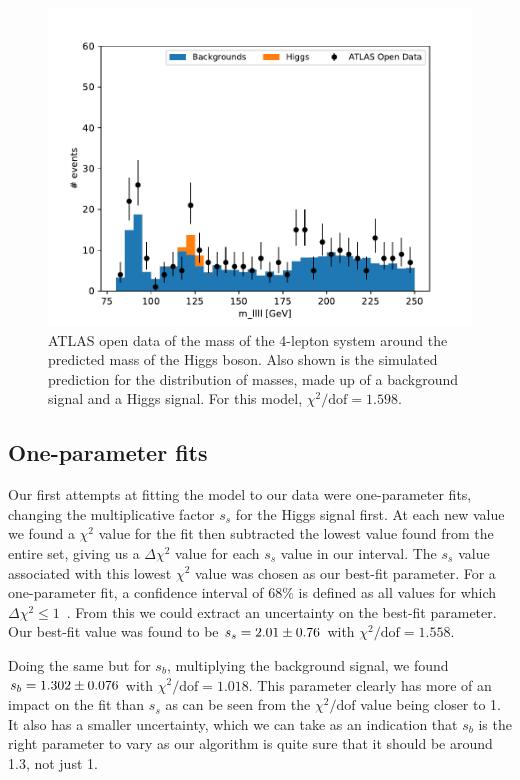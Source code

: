 \documentclass[11pt]{article}
\newcommand{\chisq}{\chi^2}
\newcommand{\chisqdof}{\chi^2/\mathrm{dof}}
\numberwithin{equation}{section}
\numberwithin{figure}{section}
\numberwithin{table}{section}
\begin{document}
\begin{figure}[h]
    \begin{center}
        \includegraphics[width=.6\textwidth]{Plots/no_fit_hist.pdf}
        \caption{ATLAS open data of the mass of the 4-lepton system around the predicted mass of the Higgs boson. Also shown is the simulated prediction for the distribution of masses, made up of a background signal and a Higgs signal. For this model, $\chisqdof=\num{1.598}$.}
        \label{fig:no_fit_hist}
    \end{center}
\end{figure}

\subsection{One-parameter fits}
Our first attempts at fitting the model to our data were one-parameter fits, changing the multiplicative factor $s_s$ for the Higgs signal first. At each new value we found a $\chisq$ value for the fit then subtracted the lowest value found from the entire set, giving us a $\Delta\chisq$ value for each $s_s$ value in our interval. The $s_s$ value associated with this lowest $\chisq$ value was chosen as our best-fit parameter. For a one-parameter fit, a confidence interval of $68\%$ is defined as all values for which $\Delta\chisq\leq1$~\cite{XRay_energy_spectra}. From this we could extract an uncertainty on the best-fit parameter. Our best-fit value was found to be $s_s=\num{2.01 \pm0.76}$ with $\chisqdof=1.558$.

Doing the same but for $s_b$, multiplying the background signal, we found $s_b=\num{1.302\pm0.076}$ with $\chisqdof=1.018$. This parameter clearly has more of an impact on the fit than $s_s$ as can be seen from the $\chisqdof$ value being closer to 1. It also has a smaller uncertainty, which we can take as an indication that $s_b$ is the right parameter to vary as our algorithm is quite sure that it should be around 1.3, not just 1.
\end{document}
